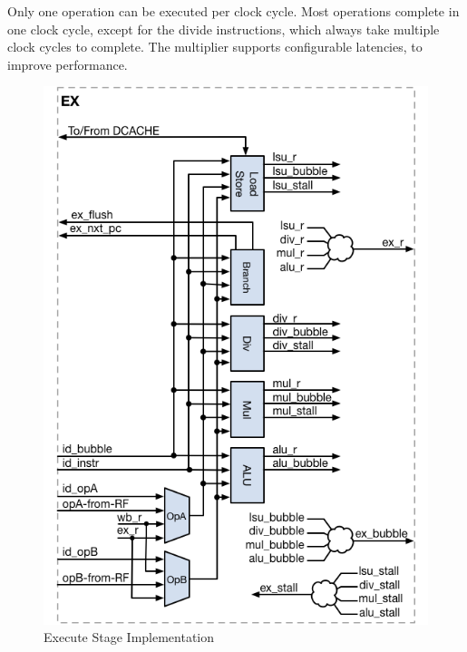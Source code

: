 Only one operation can be executed per clock cycle.
Most operations complete in one clock cycle, except for the divide instructions, which always take multiple clock cycles to complete. 
The multiplier supports configurable latencies, to improve performance.


\begin{figure}[h]
  \includegraphics{assets/img/Pipeline-EX}
  \caption{Execute Stage Implementation}
\end{figure}


